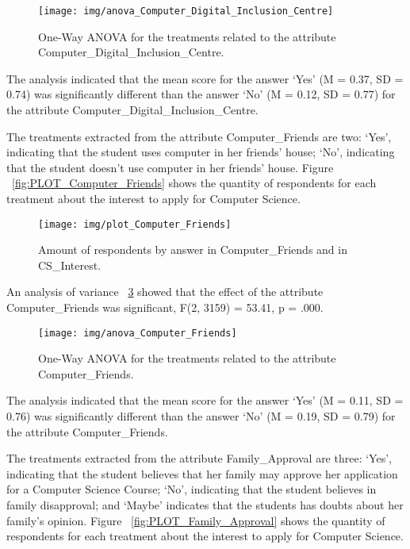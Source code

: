 \begin{figure}%
\texttt{[image: img/anova\_Computer\_Digital\_Inclusion\_Centre]}%
\caption{One-Way ANOVA for the treatments related to the attribute Computer_Digital_Inclusion_Centre.}%
\label{fig:ANOVA_Computer_Digital_Inclusion_Centre}%
\end{figure}%

The analysis indicated that the mean score for the answer `Yes' (M = 0.37, SD = 0.74) was significantly different than the answer `No' (M = 0.12, SD = 0.77) for the attribute Computer_Digital_Inclusion_Centre.

The treatments extracted from the attribute Computer_Friends are two: `Yes', indicating that the student uses computer in her friends' house; `No', indicating that the student doesn't use computer in her friends' house. Figure ~\ref{fig:PLOT_Computer_Friends} shows the quantity of respondents for each treatment about the interest to apply for Computer Science.

\begin{figure}%
\texttt{[image: img/plot\_Computer\_Friends]}%
\caption{Amount of respondents by answer in Computer_Friends and in CS_Interest.}%
\label{fig:plot_Computer_Friends}%
\end{figure}%

An analysis of variance ~\ref{fig:ANOVA_Computer_Friends} showed that the effect of the attribute Computer_Friends was significant, F(2, 3159) = 53.41, p = .000.

\begin{figure}%
\texttt{[image: img/anova\_Computer\_Friends]}%
\caption{One-Way ANOVA for the treatments related to the attribute Computer_Friends.}%
\label{fig:ANOVA_Computer_Friends}%
\end{figure}%

The analysis indicated that the mean score for the answer `Yes' (M = 0.11, SD = 0.76) was significantly different than the answer `No' (M = 0.19, SD = 0.79) for the attribute Computer_Friends.

The treatments extracted from the attribute Family_Approval are three: `Yes', indicating that the student believes that her family may approve her application for a Computer Science Course; `No', indicating that the student believes in family disapproval; and  `Maybe' indicates that the students has doubts about her family's opinion. Figure ~\ref{fig:PLOT_Family_Approval} shows the quantity of respondents for each treatment about the interest to apply for Computer Science.

